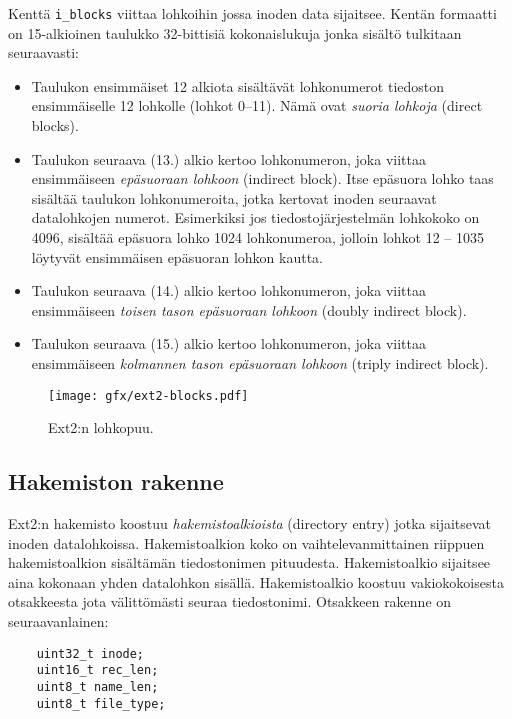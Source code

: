 Kenttä \texttt{i\_blocks} viittaa lohkoihin jossa inoden data sijaitsee.
Kentän formaatti on 15-alkioinen taulukko 32-bittisiä kokonaislukuja jonka sisältö tulkitaan seuraavasti:
\begin{itemize}
    \item Taulukon ensimmäiset 12 alkiota sisältävät lohkonumerot tiedoston ensimmäiselle 12 lohkolle (lohkot 0--11).
          Nämä ovat \emph{suoria lohkoja} (direct blocks).
    \item Taulukon seuraava (13.) alkio kertoo lohkonumeron, joka viittaa ensimmäiseen \emph{epäsuoraan lohkoon} (indirect block).
          Itse epäsuora lohko taas sisältää taulukon lohkonumeroita, jotka kertovat inoden seuraavat datalohkojen numerot.
          Esimerkiksi jos tiedostojärjestelmän lohkokoko on 4096, sisältää epäsuora lohko 1024 lohkonumeroa,
          jolloin lohkot 12 -- 1035 löytyvät ensimmäisen epäsuoran lohkon kautta.
    \item Taulukon seuraava (14.) alkio kertoo lohkonumeron, joka viittaa ensimmäiseen \emph{toisen tason epäsuoraan lohkoon} (doubly indirect block).

    \item Taulukon seuraava (15.) alkio kertoo lohkonumeron, joka viittaa ensimmäiseen \emph{kolmannen tason epäsuoraan lohkoon} (triply indirect block).
\end{itemize}

\begin{figure}
    \label{FigExt2BlockMap}
    \centering
    \texttt{[image: gfx/ext2-blocks.pdf]}
    \caption{Ext2:n lohkopuu.}
\end{figure}

\subsection{Hakemiston rakenne}
Ext2:n hakemisto koostuu \emph{hakemistoalkioista} (directory entry) jotka sijaitsevat inoden datalohkoissa.
Hakemistoalkion koko on vaihtelevanmittainen riippuen hakemistoalkion sisältämän tiedostonimen pituudesta.
Hakemistoalkio sijaitsee aina kokonaan yhden datalohkon sisällä.
Hakemistoalkio koostuu vakiokokoisesta otsakkeesta jota välittömästi seuraa tiedostonimi.
Otsakkeen rakenne on seuraavanlainen:

\begin{verbatim}
	uint32_t inode;
	uint16_t rec_len;
	uint8_t name_len;
	uint8_t file_type;
\end{verbatim}

